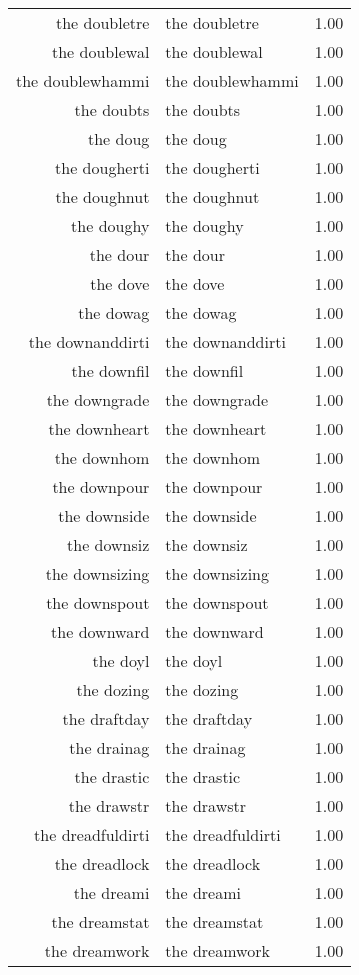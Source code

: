 \begin{table}[ht]
\begin{tabular}{rlr}
  the doubletre & the doubletre & 1.00 \\ 
  the doublewal & the doublewal & 1.00 \\ 
  the doublewhammi & the doublewhammi & 1.00 \\ 
  the doubts & the doubts & 1.00 \\ 
  the doug & the doug & 1.00 \\ 
  the dougherti & the dougherti & 1.00 \\ 
  the doughnut & the doughnut & 1.00 \\ 
  the doughy & the doughy & 1.00 \\ 
  the dour & the dour & 1.00 \\ 
  the dove & the dove & 1.00 \\ 
  the dowag & the dowag & 1.00 \\ 
  the downanddirti & the downanddirti & 1.00 \\ 
  the downfil & the downfil & 1.00 \\ 
  the downgrade & the downgrade & 1.00 \\ 
  the downheart & the downheart & 1.00 \\ 
  the downhom & the downhom & 1.00 \\ 
  the downpour & the downpour & 1.00 \\ 
  the downside & the downside & 1.00 \\ 
  the downsiz & the downsiz & 1.00 \\ 
  the downsizing & the downsizing & 1.00 \\ 
  the downspout & the downspout & 1.00 \\ 
  the downward & the downward & 1.00 \\ 
  the doyl & the doyl & 1.00 \\ 
  the dozing & the dozing & 1.00 \\ 
  the draftday & the draftday & 1.00 \\ 
  the drainag & the drainag & 1.00 \\ 
  the drastic & the drastic & 1.00 \\ 
  the drawstr & the drawstr & 1.00 \\ 
  the dreadfuldirti & the dreadfuldirti & 1.00 \\ 
  the dreadlock & the dreadlock & 1.00 \\ 
  the dreami & the dreami & 1.00 \\ 
  the dreamstat & the dreamstat & 1.00 \\ 
  the dreamwork & the dreamwork & 1.00 \\ 

\end{tabular}
\end{table}
